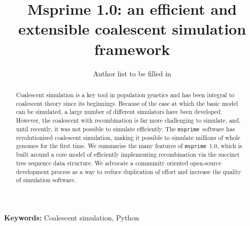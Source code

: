 \documentclass{article}
\newcommand{\msprime}[0]{\texttt{msprime}}
\begin{document}
\title{Msprime 1.0: an efficient and extensible coalescent simulation framework}
\author{Author list to be filled in
}


\maketitle



\begin{abstract}
Coalescent simulation is a key tool in population genetics and
has been integral to coalescent theory since its beginnings.
Because of the ease at which the basic model can be simulated,
a large number of different simulators have been developed. However,
the coalescent with recombination is far more challenging to simulate,
and, until recently, it was not possible to simulate efficiently.
The \msprime\ software has revolutionised
coalescent simulation, making it possible to simulate millions
of whole genomes for the first time. We summarise the many features
of \msprime\ 1.0, which is built around a core model of efficiently
implementing recombination via the succinct tree sequence data
structure. We advocate a community oriented open-source development
process as a way to reduce duplication of effort and increase
the quality of simulation software.
\end{abstract}

\textbf{Keywords:} Coalescent simulation, Python

\end{document}
